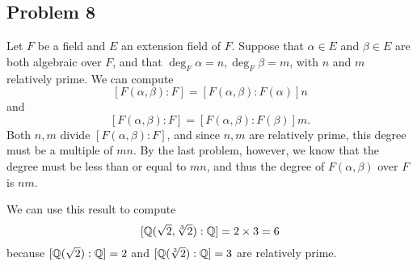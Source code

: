 \documentclass{../../mathnotes}
\begin{document}
\subsection*{Problem 8}

Let $F$ be a field and $E$ an extension field of $F$. Suppose that $\alpha\in E$ and $\beta\in E$ are both algebraic over
$F$, and that $\deg_F\alpha=n,\deg_F\beta=m$, with $n$ and $m$ relatively prime. We can compute
\[ [F(\alpha,\beta):F]=[F(\alpha,\beta):F(\alpha)]n \]
and
\[ [F(\alpha,\beta):F]=[F(\alpha,\beta):F(\beta)]m. \]
Both $n,m$ divide $[F(\alpha,\beta):F]$, and since $n,m$ are relatively prime, this degree must be a multiple of $mn$.
By the last problem, however, we know that the degree must be less than or equal to $mn$, and thus the degree of $F(\alpha,\beta)$
over $F$ is $nm$.

We can use this result to compute 
\[ [\mathbb{Q}(\sqrt{2},\sqrt[3]{2}):\mathbb{Q}]=2\times3=6\]
because $[\mathbb{Q}(\sqrt{2}):\mathbb{Q}]=2$ and $[\mathbb{Q}(\sqrt[3]{2}):\mathbb{Q}]=3$ are relatively prime.
\end{document}
